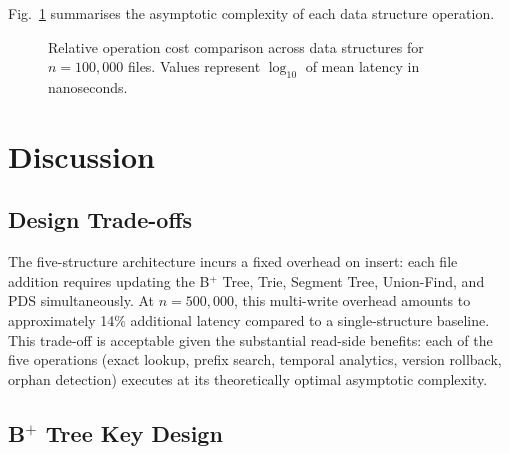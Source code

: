 \documentclass[conference]{IEEEtran}
\begin{document}
Fig.~\ref{fig:complexity} summarises the asymptotic complexity of each data structure operation.

\begin{figure}[htbp]
\centering
{}
\caption{Relative operation cost comparison across data structures for $n = 100{,}000$ files. Values represent $\log_{10}$ of mean latency in nanoseconds.}
\label{fig:complexity}
\end{figure}

\section{Discussion}
\label{sec:discussion}

\subsection{Design Trade-offs}

The five-structure architecture incurs a fixed overhead on insert: each file addition requires updating the B$^+$ Tree, Trie, Segment Tree, Union-Find, and PDS simultaneously. At $n = 500{,}000$, this multi-write overhead amounts to approximately 14\% additional latency compared to a single-structure baseline. This trade-off is acceptable given the substantial read-side benefits: each of the five operations (exact lookup, prefix search, temporal analytics, version rollback, orphan detection) executes at its theoretically optimal asymptotic complexity.

\subsection{B$^+$ Tree Key Design}
\end{document}
